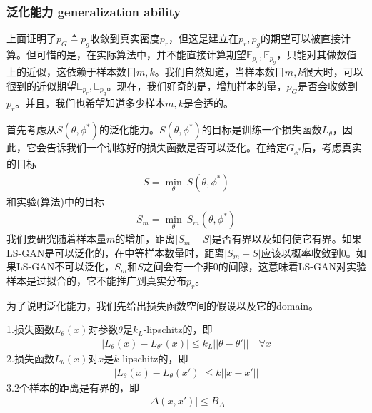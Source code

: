         \subsubsection{泛化能力 generalization ability}
            \par
            上面证明了$p_G\triangleq p_g$收敛到真实密度$p_r$，但这是建立在$p_r,p_g$的期望可以被直接计算。但可惜的是，在实际算法中，并不能直接计算期望$\mathbb{E}_{p_r},\mathbb{E}_{p_g}$，只能对其做数值上的近似，这依赖于样本数目$m,k$。我们自然知道，当样本数目$m,k$很大时，可以很到的近似期望$\mathbb{E}_{p_r},\mathbb{E}_{p_g}$。现在，我们好奇的是，增加样本的量，$p_G$是否会收敛到$p_r$。并且，我们也希望知道多少样本$m,k$是合适的。
            \par
            首先考虑从$S(\theta,\phi^*)$的泛化能力。$S(\theta,\phi^*)$的目标是训练一个损失函数$L_\theta$，因此，它会告诉我们一个训练好的损失函数是否可以泛化。在给定$G_{\phi^*}$后，考虑真实的目标
            \begin{align*}
            S = \min_\theta \ S(\theta,\phi^*)
            \end{align*}
            和实验(算法)中的目标
            \begin{align*}
            S_m = \min_\theta \ S_m(\theta,\phi^*)
            \end{align*}
            我们要研究随着样本量$m$的增加，距离$|S_m - S|$是否有界以及如何使它有界。如果LS-GAN是可以泛化的，在中等样本数量时，距离$|S_m-S|$应该以概率收敛到0。如果LS-GAN不可以泛化，$S_m$和$S$之间会有一个非0的间隙，这意味着LS-GAN对实验样本是过拟合的，它不能推广到真实分布$p_r$。
            \par
            为了说明泛化能力，我们先给出损失函数空间的假设以及它的domain。
            \begin{Assumption}[2]
            1.损失函数$L_\theta(x)$对参数$\theta$是$k_L$-lipschitz的，即
            \begin{align*}
            |L_\theta(x) - L_{\theta'}(x)| \leqslant k_L||\theta-\theta'|| \quad \forall x
            \end{align*}
            2.损失函数$L_\theta(x)$对$x$是$k$-lipschitz的，即
            \begin{align*}
            |L_\theta(x) - L_\theta(x')| \leqslant k||x-x'||
            \end{align*}
            3.2个样本的距离是有界的，即
            \begin{align*}
            |\Delta (x,x')| \leqslant B_\Delta
            \end{align*}
            \end{Assumption}

